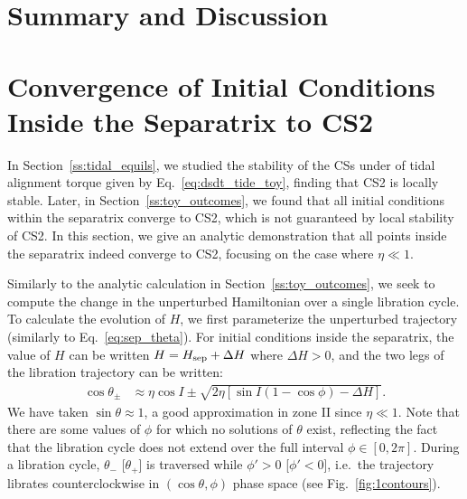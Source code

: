 \documentclass[
        fleqn,
        usenatbib,
    ]{mnras}
\newcommand*{\p}[1]{\left(#1\right)}
\newcommand*{\s}[1]{\left[#1\right]}
\begin{document}
\section{Summary and Discussion}\label{s:summary}




\appendix

\onecolumn

\section{Convergence of Initial Conditions Inside the Separatrix to CS2
}\label{app:cs_stab2}

In Section~\ref{ss:tidal_equils}, we studied the stability of the CSs under of
tidal alignment torque given by Eq.~\eqref{eq:dsdt_tide_toy}, finding that CS2
is locally stable. Later, in Section~\ref{ss:toy_outcomes}, we found that all
initial conditions within the separatrix converge to CS2, which is not
guaranteed by local stability of CS2. In this section, we give an analytic
demonstration that all points inside the separatrix indeed converge to CS2,
focusing on the case where $\eta \ll 1$.

Similarly to the analytic calculation in Section~\ref{ss:toy_outcomes}, we seek
to compute the change in the unperturbed Hamiltonian over a single libration
cycle. To calculate the evolution of $H$, we first parameterize the unperturbed
trajectory (similarly to Eq.~\ref{eq:sep_theta}). For initial conditions inside
the separatrix, the value of $H$ can be written $H = H_{\rm sep} + \Delta H$
where $\Delta H > 0$, and the two legs of the libration trajectory can be
written:
\begin{align}
    \cos \theta_{\pm} &\approx
        \eta \cos I \pm \sqrt{2\eta\s{\sin I\p{1 - \cos \phi} - \Delta H}}.
        \label{eq:lib_cycle_toy}
\end{align}
We have taken $\sin \theta \approx 1$, a good approximation in zone II since
$\eta \ll 1$. Note that there are some values of $\phi$ for which no solutions
of $\theta$ exist, reflecting the fact that the libration cycle does not extend
over the full interval $\phi \in [0, 2\pi]$. During a libration cycle,
$\theta_-$ [$\theta_+$] is traversed while $\phi' > 0$ [$\phi' < 0$], i.e.\ the
trajectory librates counterclockwise in $(\cos \theta, \phi)$ phase space (see
Fig.~\ref{fig:1contours}).
\end{document}
